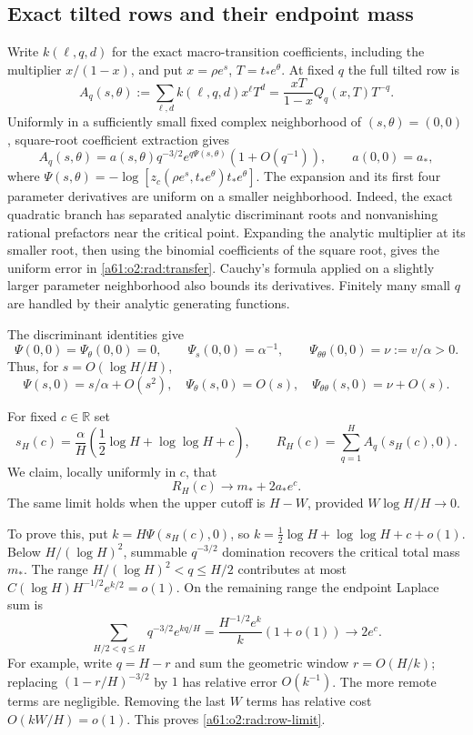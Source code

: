 \documentclass[11pt,letterpaper]{article}
\numberwithin{equation}{section}
\theoremstyle{remark}\newtheorem{remark}[theorem]{Remark}
\begin{document}
\subsection{Exact tilted rows and their endpoint mass}

Write $k(\ell,q,d)$ for the exact macro-transition coefficients,
including the multiplier $x/(1-x)$, and put $x=\rho e^s$,
$T=t_*e^\theta$. At fixed $q$ the full tilted row is
\[
 A_q(s,\theta)
 :=\sum_{\ell,d}k(\ell,q,d)x^\ell T^d
 =\frac{xT}{1-x}Q_q(x,T)T^{-q}.
\]
Uniformly in a sufficiently small fixed complex neighborhood of
$(s,\theta)=(0,0)$, square-root coefficient extraction gives
\begin{equation}\label{a61:o2:rad:transfer}
 A_q(s,\theta)=a(s,\theta)q^{-3/2}
               e^{q\Psi(s,\theta)}(1+O(q^{-1})),
 \qquad a(0,0)=a_*,
\end{equation}
where
$\Psi(s,\theta)=-\log[z_c(\rho e^s,t_*e^\theta)t_*e^\theta]$.
The expansion and its first four parameter derivatives are uniform
on a smaller neighborhood. Indeed, the exact quadratic branch has
separated analytic discriminant roots and nonvanishing rational
prefactors near the critical point. Expanding the analytic multiplier
at its smaller root, then using the binomial coefficients of the
square root, gives the uniform error in \eqref{a61:o2:rad:transfer}.
Cauchy's formula applied on a slightly larger parameter neighborhood
also bounds its derivatives. Finitely many small $q$ are handled by
their analytic generating functions.

The discriminant identities give
\[
 \Psi(0,0)=\Psi_\theta(0,0)=0,\qquad
 \Psi_s(0,0)=\alpha^{-1},\qquad
 \Psi_{\theta\theta}(0,0)=\nu:=v/\alpha>0.
\]
Thus, for $s=O(\log H/H)$,
\begin{equation}\label{a61:o2:rad:derivatives}
 \Psi(s,0)=s/\alpha+O(s^2),\quad
 \Psi_\theta(s,0)=O(s),\quad
 \Psi_{\theta\theta}(s,0)=\nu+O(s).
\end{equation}

For fixed $c\in\mathbb R$ set
\[
 s_H(c)=\frac\alpha H
            \left(\frac12\log H+\log\log H+c\right),
 \qquad R_H(c)=\sum_{q=1}^H A_q(s_H(c),0).
\]
We claim, locally uniformly in $c$, that
\begin{equation}\label{a61:o2:rad:row-limit}
 R_H(c)\longrightarrow m_*+2a_* e^c.
\end{equation}
The same limit holds when the upper cutoff is $H-W$, provided
$W\log H/H\to0$.

To prove this, put $k=H\Psi(s_H(c),0)$, so
$k=\tfrac12\log H+\log\log H+c+o(1)$.
Below $H/(\log H)^2$, summable $q^{-3/2}$ domination recovers the
critical total mass $m_*$.
The range $H/(\log H)^2<q\le H/2$ contributes at most
$C(\log H)H^{-1/2}e^{k/2}=o(1)$. On the remaining range the
endpoint Laplace sum is
\begin{equation}\label{a61:o2:rad:laplace-sum}
 \sum_{H/2<q\le H}q^{-3/2}e^{kq/H}
 =\frac{H^{-1/2}e^k}{k}(1+o(1))\longrightarrow2e^c.
\end{equation}
For example, write $q=H-r$ and sum the geometric window
$r=O(H/k)$; replacing $(1-r/H)^{-3/2}$ by $1$ has relative error
$O(k^{-1})$. The more remote terms are negligible. Removing the last
$W$ terms has relative cost $O(kW/H)=o(1)$.
This proves \eqref{a61:o2:rad:row-limit}.
\end{document}
